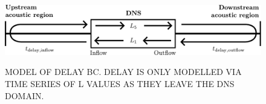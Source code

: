 
\begin{figure}[t]
\centering
\includegraphics[scale=0.65]{assets/imgs/delay_bc_model.pdf}
\label{fig:delay-model}
\caption{MODEL OF DELAY BC. DELAY IS ONLY MODELLED VIA TIME SERIES OF L VALUES AS THEY LEAVE THE DNS DOMAIN.}
\end{figure}


